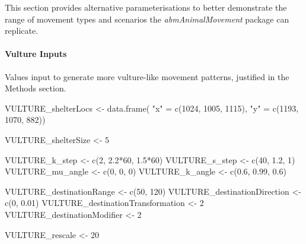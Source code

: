 \documentclass[10pt,a4paper]{article}
\newenvironment{Shaded}{}{}
\newcommand{\DecValTok}[1]{#1}
\newcommand{\FloatTok}[1]{#1}
\newcommand{\FunctionTok}[1]{#1}
\newcommand{\NormalTok}[1]{#1}
\newcommand{\OtherTok}[1]{#1}
\newcommand{\SpecialCharTok}[1]{#1}
\newcommand{\StringTok}[1]{#1}
\begin{document}
This section provides alternative parameterisations to better demonstrate the range of movement types and scenarios the \emph{abmAnimalMovement} package can replicate.

\hypertarget{vulture-inputs}{%
\paragraph{Vulture Inputs}\label{vulture-inputs}}

Values input to generate more vulture-like movement patterns, justified in the Methods section.

\begin{Shaded}
\begin{Highlighting}[]
\NormalTok{VULTURE\_shelterLocs }\OtherTok{\textless{}{-}} \FunctionTok{data.frame}\NormalTok{(}
  \StringTok{"x"} \OtherTok{=} \FunctionTok{c}\NormalTok{(}\DecValTok{1024}\NormalTok{, }\DecValTok{1005}\NormalTok{, }\DecValTok{1115}\NormalTok{),}
  \StringTok{"y"} \OtherTok{=} \FunctionTok{c}\NormalTok{(}\DecValTok{1193}\NormalTok{, }\DecValTok{1070}\NormalTok{, }\DecValTok{882}\NormalTok{))}

\NormalTok{VULTURE\_shelterSize }\OtherTok{\textless{}{-}} \DecValTok{5}


\NormalTok{VULTURE\_k\_step }\OtherTok{\textless{}{-}} \FunctionTok{c}\NormalTok{(}\DecValTok{2}\NormalTok{, }\FloatTok{2.2}\SpecialCharTok{*}\DecValTok{60}\NormalTok{, }\FloatTok{1.5}\SpecialCharTok{*}\DecValTok{60}\NormalTok{)}
\NormalTok{VULTURE\_s\_step }\OtherTok{\textless{}{-}} \FunctionTok{c}\NormalTok{(}\DecValTok{40}\NormalTok{, }\FloatTok{1.2}\NormalTok{, }\DecValTok{1}\NormalTok{)}
\NormalTok{VULTURE\_mu\_angle }\OtherTok{\textless{}{-}} \FunctionTok{c}\NormalTok{(}\DecValTok{0}\NormalTok{, }\DecValTok{0}\NormalTok{, }\DecValTok{0}\NormalTok{)}
\NormalTok{VULTURE\_k\_angle }\OtherTok{\textless{}{-}} \FunctionTok{c}\NormalTok{(}\FloatTok{0.6}\NormalTok{, }\FloatTok{0.99}\NormalTok{, }\FloatTok{0.6}\NormalTok{)}

\NormalTok{VULTURE\_destinationRange }\OtherTok{\textless{}{-}} \FunctionTok{c}\NormalTok{(}\DecValTok{50}\NormalTok{, }\DecValTok{120}\NormalTok{)}
\NormalTok{VULTURE\_destinationDirection }\OtherTok{\textless{}{-}} \FunctionTok{c}\NormalTok{(}\DecValTok{0}\NormalTok{, }\FloatTok{0.01}\NormalTok{)}
\NormalTok{VULTURE\_destinationTransformation }\OtherTok{\textless{}{-}} \DecValTok{2}
\NormalTok{VULTURE\_destinationModifier }\OtherTok{\textless{}{-}} \DecValTok{2}

\NormalTok{VULTURE\_rescale }\OtherTok{\textless{}{-}} \DecValTok{20}



\end{Highlighting}
\end{Shaded}
\end{document}
